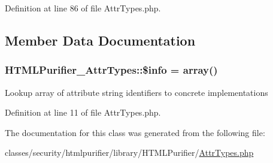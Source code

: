 Definition at line 86 of file Attr\+Types.\+php.



\subsection{Member Data Documentation}
\hypertarget{classHTMLPurifier__AttrTypes_abcc6214d1fc6a46dc5e40ddacd0f860c}{
\subsubsection[{\$info}]{\setlength{\rightskip}{0pt plus 5cm}H\+T\+M\+L\+Purifier\+\_\+\+Attr\+Types\+::\$info = array()\hspace{0.3cm}{\ttfamily [protected]}}}\label{classHTMLPurifier__AttrTypes_abcc6214d1fc6a46dc5e40ddacd0f860c}
Lookup array of attribute string identifiers to concrete implementations 

Definition at line 11 of file Attr\+Types.\+php.



The documentation for this class was generated from the following file\+:\begin{DoxyCompactItemize}
\item 
classes/security/htmlpurifier/library/\+H\+T\+M\+L\+Purifier/\hyperlink{AttrTypes_8php}{Attr\+Types.\+php}\end{DoxyCompactItemize}
